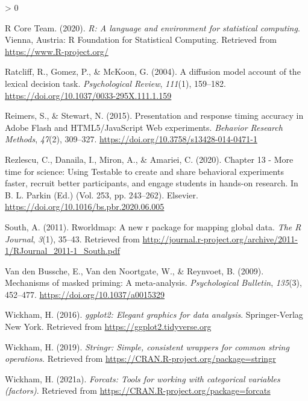 \documentclass[
  english,
  man]{apa6}
\newlength{\cslhangindent}
\newenvironment{CSLReferences}[2] %
 {%
  \setlength{\parindent}{0pt}
  \ifodd #1 \everypar{\setlength{\hangindent}{\cslhangindent}}\ignorespaces\fi
  \ifnum #2 > 0
  \setlength{\parskip}{#2\baselineskip}
  \fi
 }%
 {}
\begin{document}
\begin{CSLReferences}{1}{0}
\leavevmode\hypertarget{ref-R-base}{}%
R Core Team. (2020). \emph{R: A language and environment for statistical computing}. Vienna, Austria: R Foundation for Statistical Computing. Retrieved from \url{https://www.R-project.org/}

\leavevmode\hypertarget{ref-ratcliff2004}{}%
Ratcliff, R., Gomez, P., \& McKoon, G. (2004). A diffusion model account of the lexical decision task. \emph{Psychological Review}, \emph{111}(1), 159--182. \url{https://doi.org/10.1037/0033-295X.111.1.159}

\leavevmode\hypertarget{ref-reimersPresentationResponseTiming2015}{}%
Reimers, S., \& Stewart, N. (2015). Presentation and response timing accuracy in {Adobe Flash} and {HTML5}/{JavaScript Web} experiments. \emph{Behavior Research Methods}, \emph{47}(2), 309--327. \url{https://doi.org/10.3758/s13428-014-0471-1}

\leavevmode\hypertarget{ref-rezlescu2020}{}%
Rezlescu, C., Danaila, I., Miron, A., \& Amariei, C. (2020). Chapter 13 - More time for science: Using Testable to create and share behavioral experiments faster, recruit better participants, and engage students in hands-on research. In B. L. Parkin (Ed.) (Vol. 253, pp. 243--262). Elsevier. \url{https://doi.org/10.1016/bs.pbr.2020.06.005}

\leavevmode\hypertarget{ref-R-rworldmap}{}%
South, A. (2011). Rworldmap: A new r package for mapping global data. \emph{The R Journal}, \emph{3}(1), 35--43. Retrieved from \url{http://journal.r-project.org/archive/2011-1/RJournal_2011-1_South.pdf}

\leavevmode\hypertarget{ref-vandenbusscheMechanismsMaskedPriming2009}{}%
Van den Bussche, E., Van den Noortgate, W., \& Reynvoet, B. (2009). Mechanisms of masked priming: {A} meta-analysis. \emph{Psychological Bulletin}, \emph{135}(3), 452--477. \url{https://doi.org/10.1037/a0015329}

\leavevmode\hypertarget{ref-R-ggplot2}{}%
Wickham, H. (2016). \emph{ggplot2: Elegant graphics for data analysis}. Springer-Verlag New York. Retrieved from \url{https://ggplot2.tidyverse.org}

\leavevmode\hypertarget{ref-R-stringr}{}%
Wickham, H. (2019). \emph{Stringr: Simple, consistent wrappers for common string operations}. Retrieved from \url{https://CRAN.R-project.org/package=stringr}

\leavevmode\hypertarget{ref-R-forcats}{}%
Wickham, H. (2021a). \emph{Forcats: Tools for working with categorical variables (factors)}. Retrieved from \url{https://CRAN.R-project.org/package=forcats}


\end{CSLReferences}
\end{document}
